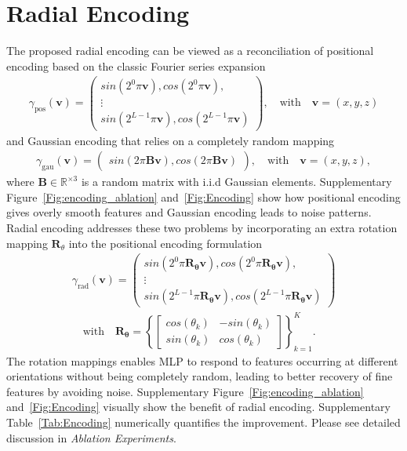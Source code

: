 \documentclass[11pt]{article}
\theoremstyle{plain} %
\def\Bbm{{\bm{B}}}
\def\vbm{{\bm{v}}}
\def\Rbm{{\bm{R}}}
\def\R{\mathbb{R}}
\def\sin{{\textit{sin}}}
\def\cos{{\textit{cos}}}
\begin{document}
\section*{Radial Encoding}
The proposed radial encoding can be viewed as a reconciliation of positional encoding based on the classic Fourier series expansion \begin{align}
\label{Eq:Pos}
\gamma_\text{pos}(\vbm) = 
        \begin{pmatrix}
           \sin\left(2^0\pi \vbm\right),\cos\left(2^0\pi \vbm\right), \\
           \vdots \\
           \sin(2^{L-1}\pi \vbm),\cos(2^{L-1}\pi \vbm)
         \end{pmatrix}, \quad\text{with}\quad\vbm=(x,y,z)
\end{align}
and Gaussian encoding that relies on a completely random mapping
\begin{align}
\label{Eq:Pos}
\gamma_\text{gau}(\vbm) = 
        \begin{pmatrix}
           \sin\left(2\pi \Bbm\vbm\right),\cos\left(2\pi \Bbm\vbm\right)
         \end{pmatrix},\quad\text{with}\quad\vbm=(x,y,z),
\end{align}
where $\Bbm\in\R^{ \times 3}$ is a random matrix with i.i.d Gaussian elements. 
Supplementary Figure~\ref{Fig:encoding_ablation} and~\ref{Fig:Encoding} show how positional encoding gives overly smooth features and Gaussian encoding leads to noise patterns. Radial encoding addresses these two problems by incorporating an extra rotation mapping $\Rbm_\theta$ into the positional encoding formulation 
\begin{align}
\label{Eq:Rad}
\gamma_\text{rad}(\vbm) = 
        \begin{pmatrix}
           \sin\left(2^0\pi\Rbm_{\bm{\theta}}\vbm\right),\cos\left(2^0\pi\Rbm_{\bm{\theta}}\vbm\right), \\
           \vdots \\
           \sin(2^{L-1}\pi\Rbm_{\bm{\theta}}\vbm),\cos(2^{L-1}\pi\Rbm_{\bm{\theta}}\vbm)
         \end{pmatrix} \\
         \quad\text{with}\quad\Rbm_{\bm{\theta}}=
         \left\{\begin{bmatrix}
           \cos(\theta_k)& -\sin(\theta_k)\\
           \sin(\theta_k) & \cos(\theta_k)
         \end{bmatrix}\right\}_{k=1}^K. \nonumber
\end{align}
The rotation mappings enables MLP to respond to features occurring at different orientations without being completely random, leading to better recovery of fine features by avoiding noise. Supplementary Figure~\ref{Fig:encoding_ablation} and~\ref{Fig:Encoding} visually show the benefit of radial encoding. Supplementary Table~\ref{Tab:Encoding}  numerically quantifies the improvement. Please see detailed discussion in \emph{Ablation Experiments}.
\end{document}
